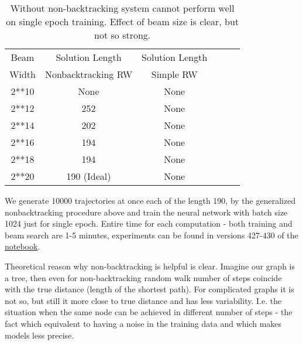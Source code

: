 \documentclass[atmp]{ipart_v1}
\numberwithin{equation}{section}
\theoremstyle{plain}%
\begin{document}
\begin{table}[h]
    \centering
    \begin{tabular}{|c|c|c|c|c|c|}
        \hline
        Beam   &  Solution Length             &  Solution Length      \\
       Width   &  Nonbacktracking RW  & Simple RW    \\
        \hline
        2**10    &       None         & None   \\
        \hline
        2**12    &       252           & None   \\
        \hline      
        2**14    &       202           & None   \\
        \hline    
        2**16    &       194           & None   \\
        \hline 
        2**18    &       194           & None   \\
        \hline  
        2**20    &       190 (Ideal)   & None   \\
        \hline        
    \end{tabular}
    \captionsetup{skip=10pt} 
    \caption{Without non-backtracking system cannot perform well on single epoch training. Effect of beam size is clear, but not so strong.   }
    \label{tab:example_nn}
\end{table}


We generate 10000 trajectories at once each of the length 190, by the generalized nonbacktracking procedure above and train the neural network with batch size 1024 just for single epoch.
Entire time for each computation - both training and beam search are 1-5 minutes, experiments can be found in versions 427-430 of the \href{https://www.kaggle.com/code/alexandervc/lrx-cayleypy-rl-mdqn?scriptVersionId=224294767}{notebook}.

Theoretical reason why non-backtracking is helpful is clear. Imagine our graph is a tree, then even for non-backtracking  random walk number of steps coincide with the true distance (length of the shortest path). For complicated graphs it is not so, but still it more close to true distance and has less variability. I.e. the situation when the same node can be achieved in different number of steps - the fact which    equivalent to having a  noise in the training data and which makes models less precise. 
\end{document}
